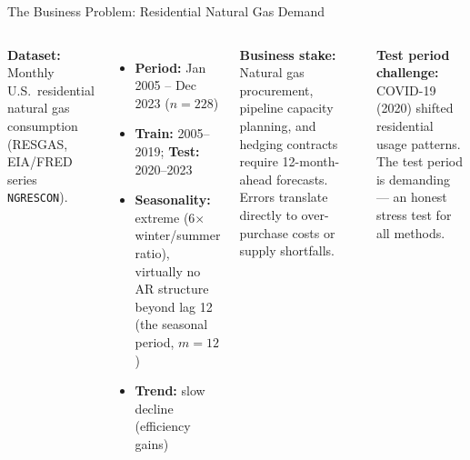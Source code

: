 \documentclass[aspectratio=169, 10pt]{beamer}
\begin{document}
\begin{frame}{The Business Problem: Residential Natural Gas Demand}
  \begin{columns}[T]
      \textbf{Dataset:} Monthly U.S.\ residential natural gas consumption
      (RESGAS, EIA/FRED series \texttt{NGRESCON}).\\[4pt]
      \begin{itemize}\small
        \item \textbf{Period:} Jan 2005 -- Dec 2023 ($n = 228$)
        \item \textbf{Train:} 2005--2019; \textbf{Test:} 2020--2023
        \item \textbf{Seasonality:} extreme (6$\times$ winter/summer ratio),
              virtually no AR structure beyond lag 12 (the seasonal period, $m = 12$)
        \item \textbf{Trend:} slow decline (efficiency gains)
      \end{itemize}
      \vspace{0.1cm}
      \textbf{Business stake:}
      {\small Natural gas procurement, pipeline capacity planning,
      and hedging contracts require 12-month-ahead forecasts.
      Errors translate directly to over-purchase costs or supply shortfalls.}
      \begin{warningbox}
        {\small \textbf{Test period challenge:}
        COVID-19 (2020) shifted residential
        usage patterns. The test period
        is demanding --- an honest
        stress test for all methods.}
      \end{warningbox}
      \vspace{0.2cm}
  \end{columns}
\end{frame}
\end{document}
